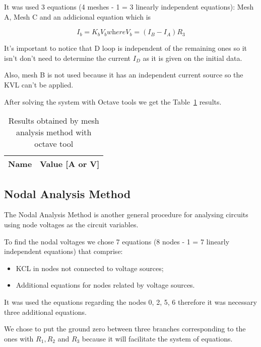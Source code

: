 It was used 3 equations (4 meshes - 1 = 3 linearly independent equations): Mesh A, Mesh C and an addicional equation which is 

\begin{equation}
I_b = K_b V_b \textit{where} V_b = (I_B - I_A)R_3
\end{equation}

It's important to notice that D loop is independent of the remaining ones so it isn't don't need to determine the current $I_D$ as it is given on the initial data.

Also, mesh B is not used because it has an independent current source so the KVL can't be applied.

After solving the system with Octave tools we get the Table~\ref{tab:mesh} results.

\begin{table}[h]
  \centering
  \begin{tabular}{|l|r|}
    \hline    
    {\bf Name} & {\bf Value [A or V]} \\ \hline
    
  \end{tabular}
  \caption{ Results obtained by mesh analysis method with octave tool}
  \label{tab:mesh}
\end{table}


\subsection{Nodal Analysis Method}

\hspace{0,5cm} The Nodal Analysis Method is another general procedure for analysing circuits using node voltages as the circuit variables. 

To find the nodal voltages we chose 7 equations (8 nodes - 1 = 7 linearly independent equations) that comprise:
\begin{itemize}
\item  KCL in nodes not connected to voltage sources;
\item Additional equations for nodes related by voltage sources.
\end{itemize}

It was used the equations regarding the nodes 0, 2, 5, 6 therefore it was necessary three additional equations.

We chose to put the ground zero between three branches corresponding to the ones with $R_1, R_2$ and $R_3$ because it will facilitate the system of equations.

